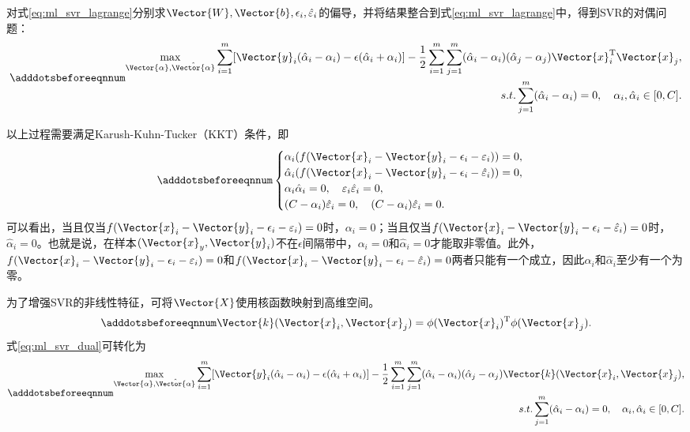 对式\ref{eq:ml_svr_lagrange}分别求$\Vector{W},\Vector{b},\epsilon_i,\hat{\varepsilon}_i$的偏导，并将结果整合到式\ref{eq:ml_svr_lagrange}中，得到SVR的对偶问题：
\begin{equation}\adddotsbeforeeqnnum
  \label{eq:ml_svr_dual}
  \begin{split}
    \max\limits_{\Vector{\alpha},\hat{\Vector{\alpha}}}\sum_{i=1}^{m}[\Vector{y}_i(\hat{\alpha}_i-\alpha_i)-\epsilon(\hat{\alpha}_i+\alpha_i)]-\frac{1}{2}\sum_{i=1}^{m}\sum_{j=1}^{m}(\hat{\alpha}_i-\alpha_i)(\hat{\alpha}_j-\alpha_j)\Vector{x}_i^{\text{T}}\Vector{x}_j,\\
    s.t. 
    \sum_{j=1}^{m}(\hat{\alpha}_i-\alpha_i)=0, \quad \alpha_i, \hat{\alpha}_i\in[0,C].
  \end{split}
\end{equation}

以上过程需要满足Karush-Kuhn-Tucker（KKT）条件，即
\begin{equation}\adddotsbeforeeqnnum
  \label{eq:ml_svr_kkt}
  \begin{cases}
    \alpha_i(f(\Vector{x}_i-\Vector{y}_i-\epsilon_i-\varepsilon_i))=0,\\
    \hat{\alpha}_i(f(\Vector{x}_i-\Vector{y}_i-\epsilon_i-\hat{\varepsilon}_i))=0,\\
    \alpha_i\hat{\alpha}_i=0,\quad  \varepsilon_i\hat{\varepsilon}_i=0,\\
    (C-\alpha_i)\hat{\varepsilon}_i=0,\quad  (C-\alpha_i)\hat{\varepsilon}_i=0.
  \end{cases}
\end{equation}
可以看出，当且仅当$f(\Vector{x}_i-\Vector{y}_i-\epsilon_i-\varepsilon_i)=0$时，$\alpha_i=0$；当且仅当$f(\Vector{x}_i-\Vector{y}_i-\epsilon_i-\hat{\varepsilon}_i)=0$时，$\hat{\alpha}_i=0$。也就是说，在样本$(\Vector{x}_y,\Vector{y}_i)$不在$\epsilon$间隔带中，$\alpha_i=0$和$\hat{\alpha}_i=0$才能取非零值。此外，$f(\Vector{x}_i-\Vector{y}_i-\epsilon_i-\varepsilon_i)=0$和$f(\Vector{x}_i-\Vector{y}_i-\epsilon_i-\hat{\varepsilon}_i)=0$两者只能有一个成立，因此$\alpha_i$和$\hat{\alpha}_i$至少有一个为零。

为了增强SVR的非线性特征，可将$\Vector{X}$使用核函数映射到高维空间。
\begin{equation}\adddotsbeforeeqnnum
  \label{eq:ml_svr_kernel}
  \Vector{k}(\Vector{x}_i,\Vector{x}_j)=\phi(\Vector{x}_i)^{\text{T}}\phi(\Vector{x}_j).
\end{equation}
式\ref{eq:ml_svr_dual}可转化为
\begin{equation}\adddotsbeforeeqnnum
  \label{eq:ml_svr_dual_kernel}
  \begin{split}
    \max\limits_{\Vector{\alpha},\hat{\Vector{\alpha}}}\sum_{i=1}^{m}[\Vector{y}_i(\hat{\alpha}_i-\alpha_i)-\epsilon(\hat{\alpha}_i+\alpha_i)]-\frac{1}{2}\sum_{i=1}^{m}\sum_{j=1}^{m}(\hat{\alpha}_i-\alpha_i)(\hat{\alpha}_j-\alpha_j)\Vector{k}(\Vector{x}_i,\Vector{x}_j),\\
    s.t. \sum_{j=1}^{m}(\hat{\alpha}_i-\alpha_i)=0, \quad \alpha_i, \hat{\alpha}_i\in[0,C].
  \end{split}
\end{equation}

